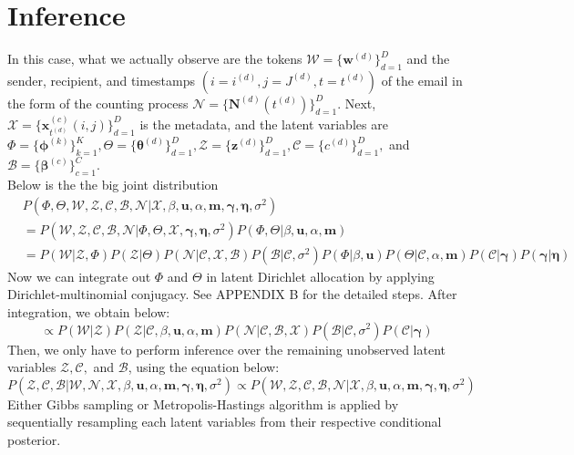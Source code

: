\documentclass[a4paper]{article}
\begin{document}
  \section{Inference}
In this case, what we actually observe are the tokens $\mathcal{W}=\{\boldsymbol{w}^{(d)} \}_{d=1}^{D}$ and the sender, recipient, and timestamps $(i=i^{(d)}, j=J^{(d)}, t=t^{(d)})$ of the email in the form of the counting process $\mathcal{N}=\{\boldsymbol{N}^{(d)}(t^{(d)}) \}_{d=1}^{D}.$ Next,  $\mathcal{X}=\{\boldsymbol{x}^{(c)}_{t^{(d)}}(i, j)\}_{d=1}^{D}$ is the metadata, and the latent variables are $\Phi=\{\boldsymbol{\phi}^{(k)}\}_{k=1}^{K}, \Theta=\{\boldsymbol{\theta}^{(d)} \}_{d=1}^{D}, \mathcal{Z}=\{\boldsymbol{z}^{(d)} \}_{d=1}^{D}, \mathcal{C}=\{{c}^{(d)} \}_{d=1}^{D},$ and $\mathcal{B}=\{\boldsymbol{\beta}^{(c)} \}_{c=1}^{C}$.\\
 \newline 
 Below is the the big joint distribution
 \begin{equation}
 \begin{aligned}
 & P(\Phi, \Theta, \mathcal{W}, \mathcal{Z}, \mathcal{C}, \mathcal{B}, \mathcal{N}| \mathcal{X}, \beta, \boldsymbol{u}, \alpha, \boldsymbol{m}, \boldsymbol{\gamma}, \boldsymbol{\eta}, \sigma^2) \\& 
 =  P(\mathcal{W}, \mathcal{Z}, \mathcal{C}, \mathcal{B}, \mathcal{N}| \Phi, \Theta, \mathcal{X}, \boldsymbol{\gamma}, \boldsymbol{\eta}, \sigma^2) P(\Phi, \Theta |\beta, \boldsymbol{u}, \alpha, \boldsymbol{m})
 \\&= P( \mathcal{W}| \mathcal{Z}, \Phi)P(\mathcal{Z}|\Theta)P(\mathcal{N}|\mathcal{C}, \mathcal{X}, \mathcal{B})P(\mathcal{B}|\mathcal{C}, \sigma^2)P(\Phi|\beta, \boldsymbol{u})P(\Theta|\mathcal{C}, \alpha, \boldsymbol{m})P(\mathcal{C}|\boldsymbol{\gamma})P(\boldsymbol{\gamma}|\boldsymbol{\eta})
 \end{aligned}
 \end{equation}
 Now we can integrate out $\Phi$ and $\Theta$ in latent Dirichlet allocation by applying Dirichlet-multinomial conjugacy. See APPENDIX B for the detailed steps. After integration, we obtain below:
 \begin{equation}
 \propto P(\mathcal{W}|\mathcal{Z})P( \mathcal{Z}|\mathcal{C}, \beta, \boldsymbol{u}, \alpha, \boldsymbol{m})P(\mathcal{N}|\mathcal{C}, \mathcal{B}, \mathcal{X})P(\mathcal{B}|\mathcal{C}, \sigma^2)P(\mathcal{C}|\boldsymbol{\gamma})
 \end{equation}
 Then, we only have to perform inference over the remaining unobserved latent variables $\mathcal{Z}, \mathcal{C},$ and $\mathcal{B}$, using the equation below:
 \begin{equation}
 P( \mathcal{Z}, \mathcal{C}, \mathcal{B}|\mathcal{W}, \mathcal{N}, \mathcal{X}, \beta, \boldsymbol{u}, \alpha, \boldsymbol{m}, \boldsymbol{\gamma}, \boldsymbol{\eta}, \sigma^2) \propto P(\mathcal{W},  \mathcal{Z}, \mathcal{C}, \mathcal{B}, \mathcal{N} | \mathcal{X}, \beta, \boldsymbol{u}, \alpha, \boldsymbol{m}, \boldsymbol{\gamma}, \boldsymbol{\eta}, \sigma^2)
 \end{equation}
 Either Gibbs sampling or Metropolis-Hastings algorithm is applied by sequentially resampling each latent variables from their respective conditional posterior.
\end{document}
